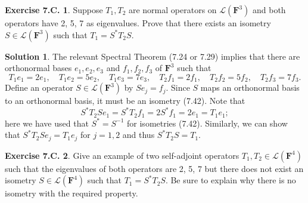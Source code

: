 \documentclass[12pt]{article}
\theoremstyle{definition}
\theoremstyle{exercise}
\newtheorem{exercise}{Exercise 7.C.}
\theoremstyle{solution}
\newtheorem*{solution}{Solution}
\newcommand{\lmap}{\mathcal{L}}
\newcommand{\F}{\mathbf{F}}
\begin{document}
\begin{exercise}
\label{ex:11}
    Suppose \( T_1, T_2 \) are normal operators on \( \lmap(\F^3) \) and both operators have 2, 5, 7 as eigenvalues. Prove that there exists an isometry \( S \in \lmap(\F^3) \) such that \( T_1 = S^* T_2 S \).
\end{exercise}

\begin{solution}
    The relevant Spectral Theorem (7.24 or 7.29) implies that there are orthonormal bases \( e_1, e_2, e_3 \) and \( f_1, f_2, f_3 \) of \( \F^3 \) such that
    \[
        T_1 e_1 = 2 e_1, \quad T_1 e_2 = 5 e_2, \quad T_1 e_3 = 7 e_3, \quad T_2 f_1 = 2 f_1, \quad T_2 f_2 = 5 f_2, \quad T_2 f_3 = 7 f_3.
    \]
    Define an operator \( S \in \lmap(\F^3) \) by \( S e_j = f_j \). Since \( S \) maps an orthonormal basis to an orthonormal basis, it must be an isometry (7.42). Note that
    \[
        S^* T_2 S e_1 = S^* T_2 f_1 = 2 S^* f_1 = 2 e_1 = T_1 e_1;
    \]
    here we have used that \( S^* = S^{-1} \) for isometries (7.42). Similarly, we can show that \( S^* T_2 S e_j = T_1 e_j \) for \( j = 1, 2 \) and thus \( S^* T_2 S = T_1 \).
\end{solution}

\begin{exercise}
\label{ex:12}
    Give an example of two self-adjoint operators \( T_1, T_2 \in \lmap(\F^4) \) such that the eigenvalues of both operators are 2, 5, 7 but there does not exist an isometry \( S \in \lmap(\F^4) \) such that \( T_1 = S^* T_2 S \). Be sure to explain why there is no isometry with the required property.
\end{exercise}
\end{document}
